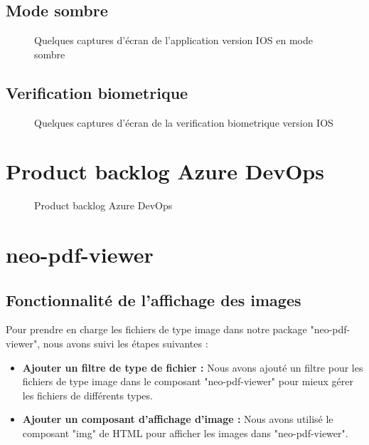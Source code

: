 \subsection{Mode sombre}
\begin{figure}[H]
    \centering
    \caption{Quelques captures d'écran de l'application version IOS en mode sombre}
    \label{appendix:capture_app1_ios}
\end{figure}
\label{appendix:sombre_ios}

\subsection{Verification biometrique}

\begin{figure}[H]
    \centering
    \caption{Quelques captures d'écran de la verification biometrique version IOS}
    \label{appendix:verification_biometrique}
\end{figure}





\section{Product backlog Azure DevOps}

\begin{figure}[H]
    \centering
    \caption{Product backlog Azure DevOps}
    \label{appendix:product_backlog_azure_devops}
\end{figure}

\label{appendix:product_backlog_azure_devops}



\section{neo-pdf-viewer}
\label{appendix:neo-pdf-viewer}

\subsection{Fonctionnalité de l'affichage des images}

Pour prendre en charge les fichiers de type image dans notre package "neo-pdf-viewer", nous avons suivi les étapes suivantes :
\begin{itemize}
    \item \textbf{Ajouter un filtre de type de fichier :} Nous avons ajouté un filtre pour les fichiers de type image dans le composant "neo-pdf-viewer" pour mieux gérer les fichiers de différents types.
    \item \textbf{Ajouter un composant d'affichage d'image :} Nous avons utilisé le composant "img" de HTML pour afficher les images dans "neo-pdf-viewer".
\end{itemize}

